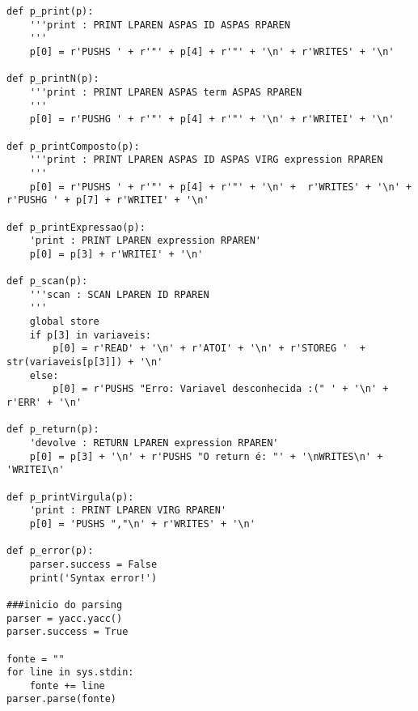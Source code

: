 \documentclass[11pt,a4paper]{report}%
\begin{document}
\begin{lstlisting}
def p_print(p): 
    '''print : PRINT LPAREN ASPAS ID ASPAS RPAREN
    '''
    p[0] = r'PUSHS ' + r'"' + p[4] + r'"' + '\n' + r'WRITES' + '\n'
    
def p_printN(p): 
    '''print : PRINT LPAREN ASPAS term ASPAS RPAREN
    '''
    p[0] = r'PUSHG ' + r'"' + p[4] + r'"' + '\n' + r'WRITEI' + '\n'

def p_printComposto(p): 
    '''print : PRINT LPAREN ASPAS ID ASPAS VIRG expression RPAREN
    '''
    p[0] = r'PUSHS ' + r'"' + p[4] + r'"' + '\n' +  r'WRITES' + '\n' + r'PUSHG ' + p[7] + r'WRITEI' + '\n'

def p_printExpressao(p):
    'print : PRINT LPAREN expression RPAREN'
    p[0] = p[3] + r'WRITEI' + '\n'

def p_scan(p): 
    '''scan : SCAN LPAREN ID RPAREN 
    '''
    global store
    if p[3] in variaveis: 
        p[0] = r'READ' + '\n' + r'ATOI' + '\n' + r'STOREG '  + str(variaveis[p[3]]) + '\n' 
    else: 
        p[0] = r'PUSHS "Erro: Variavel desconhecida :(" ' + '\n' + r'ERR' + '\n'

def p_return(p): 
    'devolve : RETURN LPAREN expression RPAREN'
    p[0] = p[3] + '\n' + r'PUSHS "O return é: "' + '\nWRITES\n' + 'WRITEI\n'

def p_printVirgula(p): 
    'print : PRINT LPAREN VIRG RPAREN'
    p[0] = 'PUSHS ","\n' + r'WRITES' + '\n'
    
def p_error(p):
    parser.success = False
    print('Syntax error!')

###inicio do parsing
parser = yacc.yacc()
parser.success = True

fonte = ""
for line in sys.stdin:
    fonte += line
parser.parse(fonte)

\end{lstlisting}



\end{document}
